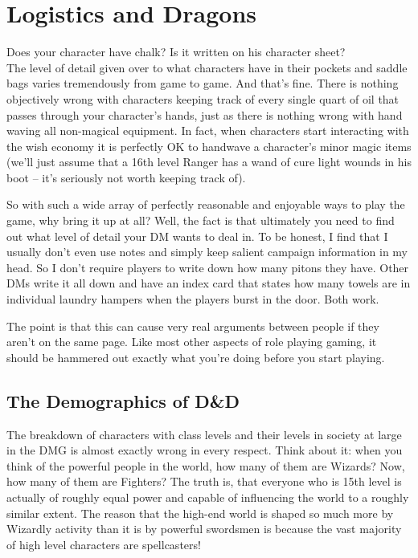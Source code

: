 
\section{Logistics and Dragons}
\vspace*{-10pt}

Does your character have chalk? Is it written on his character sheet?\\

The level of detail given over to what characters have in their pockets and saddle bags varies tremendously from game to game. And that's fine. There is nothing objectively wrong with characters keeping track of every single quart of oil that passes through your character's hands, just as there is nothing wrong with hand waving all non-magical equipment. In fact, when characters start interacting with the wish economy it is perfectly OK to handwave a character's minor magic items (we'll just assume that a 16th level Ranger has a wand of cure light wounds in his boot -- it's seriously not worth keeping track of).

So with such a wide array of perfectly reasonable and enjoyable ways to play the game, why bring it up at all? Well, the fact is that ultimately you need to find out what level of detail your DM wants to deal in. To be honest, I find that I usually don't even use notes and simply keep salient campaign information in my head. So I don't require players to write down how many pitons they have. Other DMs write it all down and have an index card that states how many towels are in individual laundry hampers when the players burst in the door. Both work.

The point is that this can cause very real arguments between people if they aren't on the same page. Like most other aspects of role playing gaming, it should be hammered out exactly what you're doing before you start playing.

\subsection{The Demographics of D\&D}
\vspace*{-8pt}

The breakdown of characters with class levels and their levels in society at large in the DMG is almost exactly wrong in every respect. Think about it: when you think of the powerful people in the world, how many of them are Wizards? Now, how many of them are Fighters? The truth is, that everyone who is 15th level is actually of roughly equal power and capable of influencing the world to a roughly similar extent. The reason that the high-end world is shaped so much more by Wizardly activity than it is by powerful swordsmen is because the vast majority of high level characters are spellcasters!

